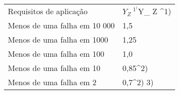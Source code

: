 \begin{table}[]
\begin{tabular}{ll}
Requisitos de aplicação      & \(Y_Z \ ^1^)\)Y_ Z ^1)    \\
Menos de uma falha em 10 000 & 1,5       \\
Menos de uma falha em 1000   & 1,25      \\
Menos de uma falha em 100    & 1,0       \\
Menos de uma falha em 10     & 0,85^2)   \\
Menos de uma falha em 2      & 0,7^2) 3)
\end{tabular}
\end{table}